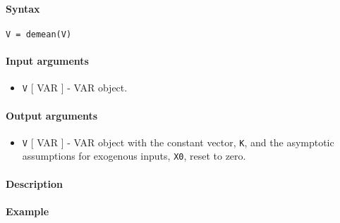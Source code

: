 


	\paragraph{Syntax}\label{syntax}

\begin{verbatim}
V = demean(V)
\end{verbatim}

\paragraph{Input arguments}\label{input-arguments}

\begin{itemize}
\itemsep1pt\parskip0pt
\item
  \texttt{V} {[} VAR {]} - VAR object.
\end{itemize}

\paragraph{Output arguments}\label{output-arguments}

\begin{itemize}
\itemsep1pt\parskip0pt
\item
  \texttt{V} {[} VAR {]} - VAR object with the constant vector,
  \texttt{K}, and the asymptotic assumptions for exogenous inputs,
  \texttt{X0}, reset to zero.
\end{itemize}

\paragraph{Description}\label{description}

\paragraph{Example}\label{example}


